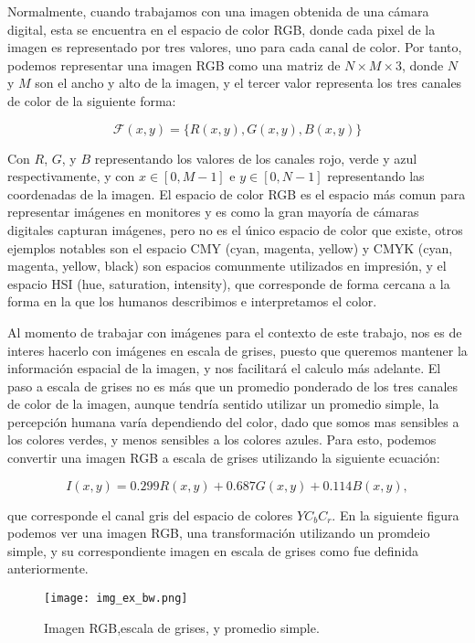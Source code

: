 Normalmente, cuando trabajamos con una imagen obtenida de una c\'amara digital, esta se encuentra en el espacio de color RGB, donde cada pixel de la imagen es representado por tres valores, uno para cada canal de color. Por tanto, podemos representar una imagen RGB como una matriz de $N \times M \times 3$, donde $N$ y $M$ son el ancho y alto de la imagen, y el tercer valor representa los tres canales de color de la siguiente forma:

$$
\mathcal{F}(x, y)=\{R(x, y), G(x, y), B(x, y)\}
$$


Con $R$, $G$, y $B$ representando los valores de los canales rojo, verde y azul respectivamente, y con $x\in[0,M-1]$ e $y\in[0,N-1]$ representando las coordenadas de la imagen. El espacio de color RGB es el espacio m\'as comun para representar im\'agenes en monitores y es como la gran mayoría de c\'amaras digitales capturan im\'agenes, pero no es el \'unico espacio de color que existe, otros ejemplos notables son el espacio CMY (cyan, magenta, yellow) y CMYK (cyan, magenta, yellow, black) son espacios comunmente utilizados en impresi\'on, y el espacio HSI (hue, saturation, intensity), que corresponde de forma cercana a la forma en la que los humanos describimos e interpretamos el color. \cite{DigitalImageProcessing}

Al momento de trabajar con im\'agenes para el contexto de este trabajo, nos es de interes hacerlo con im\'agenes en escala de grises, puesto que queremos mantener la informaci\'on espacial de la imagen, y nos facilitar\'a el calculo m\'as adelante. El paso a escala de grises no es más que un promedio ponderado de los tres canales de color de la imagen, aunque tendría sentido utilizar un promedio simple, la percepción humana varía dependiendo del color, dado que somos mas sensibles a los colores verdes, y menos sensibles a los colores azules. Para esto, podemos convertir una imagen RGB a escala de grises utilizando la siguiente ecuaci\'on:

\begin{equation}
    I(x, y)=0.299 R(x, y)+0.687 G(x, y)+0.114 B(x, y), 
    \label{eq:grayscale}
\end{equation}

que corresponde el canal gris del espacio de colores $YC_bC_r$. En la siguiente figura podemos ver una imagen RGB, una transformaci\'on utilizando un promdeio simple, y su correspondiente imagen en escala de grises como fue definida anteriormente.

\begin{figure}[H]
    \centering
    \texttt{[image: img\_ex\_bw.png]}
    \caption{Imagen RGB,escala de grises, y promedio simple.}
    \label{fig:rgb2gray}
\end{figure}


